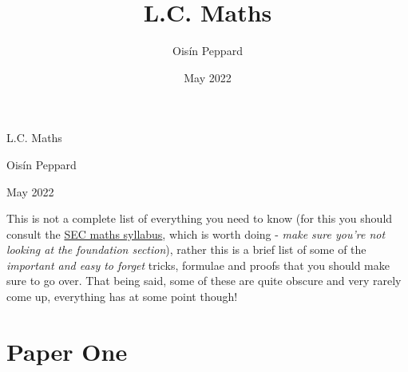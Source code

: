 \documentclass[10pt,a4paper]{article}
\title{L.C. Maths}
\author{Oisín Peppard}
\date{May 2022}
\newcommand{\Title}[1]{\begin{center}\textcolor{navi}{\begin{Huge}#1\vspace{1pt}\end{Huge}}\end{center}}
\newcommand{\SubTitle}[1]{\begin{center}\textcolor{navi}{#1\vspace{1pt}}\end{center}}
\begin{document}
\Title{L.C. Maths}
\SubTitle{Oisín Peppard}
\SubTitle{May 2022}
\hrulefill

This is not a complete list of everything you need to know (for this you should consult the \href{https://www.curriculumonline.ie/getmedia/f6f2e822-2b0c-461e-bcd4-dfcde6decc0c/SCSEC25_Maths_syllabus_examination-2015_English.pdf}{SEC maths syllabus}, which is worth doing - \textit{make sure you're not looking at the foundation section}), rather this is a brief list of some of the {\emph{important and easy to forget}} tricks, formulae and proofs that you should make sure to go over. That being said, some of these are quite obscure and very rarely come up, everything has at some point though!

\section{Paper One}
\end{document}
